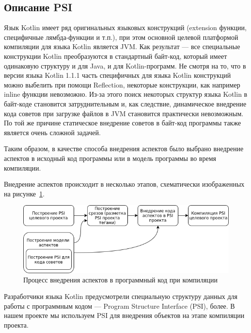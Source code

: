 \subsection{Описание PSI}
\label{sub:psi_description}
Язык Kotlin имеет ряд оригинальных языковых конструкций (extension функции,
специфичные лямбда-функции и т.п.), при этом основной целевой платформой
компиляции для языка Kotlin является JVM.
Как результат --- все специальные конструкции Kotlin преобразуются в стандартный
байт-код, который имеет одинаковую структуру и для Java, и для Kotlin-программ.
Не смотря на то, что в версии языка Kotlin 1.1.1 часть специфичных для языка
Kotlin конструкций можно выбелить при помощи Reflection, некоторые конструкции,
как например inline функции невозможно.
Из-за этого поиск некоторых структур языка Kotlin в байт-коде становится
затруднительным и, как следствие, динамическое внедрение кода советов при
загрузке файлов в JVM становится практически невозможным.
По той же причине статическое внедрение советов в байт-код программы также
является очень сложной задачей.

Таким образом, в качестве способа внедрения аспектов было выбрано внедрение аспектов в исходный код программы или в модель программы во время компиляции. 

Внедрение аспектов происходит в несколько этапов, схематически изображенных на
рисунке~\ref{fig:aspect_weaving}.
\begin{figure}[!h]
\centering
\includegraphics[width=1\textwidth]{fig/aspect_weaving}
\caption{Процесс внедрения аспектов в программный код при компиляции}
\label{fig:aspect_weaving}
\end{figure}

Разработчики языка Kotlin предусмотрели специальную структуру данных для работы
с программным кодом --- Program Structure Interface (PSI), более.
В нашем проекте мы используем PSI для внедрения объектов на этапе компиляции
проекта.

